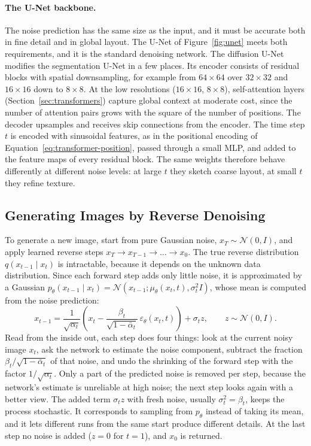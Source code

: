 \paragraph{The U-Net backbone.}
The noise prediction has the same size as the input, and it must be accurate
both in fine detail and in global layout. The U-Net of
Figure~\ref{fig:unet} meets both requirements, and it is the standard
denoising network. The diffusion U-Net modifies the segmentation U-Net in a
few places. Its encoder consists of residual blocks with spatial
downsampling, for example from $64\times64$ over $32\times32$ and
$16\times16$ down to $8\times8$. At the low resolutions ($16\times16$,
$8\times8$), self-attention layers (Section~\ref{sec:transformers}) capture
global context at moderate cost, since the number of attention pairs grows
with the square of the number of positions. The decoder upsamples and
receives skip connections from the encoder. The time step $t$ is encoded with
sinusoidal features, as in the positional encoding of
Equation~\ref{eq:transformer-position}, passed through a small MLP, and added
to the feature maps of every residual block. The same weights therefore
behave differently at different noise levels: at large $t$ they sketch
coarse layout, at small $t$ they refine texture.

\subsection{Generating Images by Reverse Denoising}

To generate a new image, start from pure Gaussian noise, $x_T\sim\mathcal
N(0,I)$, and apply learned reverse steps
$x_T\to x_{T-1}\to\dots\to x_0$. The true reverse distribution
$q(x_{t-1}\mid x_t)$ is intractable, because it depends on the unknown data
distribution. Since each forward step adds only little noise, it is
approximated by a Gaussian $p_\theta(x_{t-1}\mid x_t)=\mathcal
N(x_{t-1};\mu_\theta(x_t,t),\sigma_t^2I)$, whose mean is computed from the
noise prediction:
\begin{equation}
  x_{t-1} = \frac{1}{\sqrt{\alpha_t}}\left(x_t
  - \frac{\beta_t}{\sqrt{1-\bar\alpha_t}}\,\varepsilon_\theta(x_t,t)\right)
  + \sigma_t z,
  \qquad z\sim\mathcal N(0,I).
  \label{eq:diff-reverse}
\end{equation}
\noindent
Read from the inside out, each step does four things: look at the current
noisy image $x_t$, ask the network to estimate the noise component, subtract
the fraction $\beta_t/\sqrt{1-\bar\alpha_t}$ of that noise, and undo the
shrinking of the forward step with the factor $1/\sqrt{\alpha_t}$. Only a
part of the predicted noise is removed per step, because the network's
estimate is unreliable at high noise; the next step looks again with a better
view. The added term $\sigma_t z$ with fresh noise, usually
$\sigma_t^2=\beta_t$, keeps the process stochastic. It corresponds to
sampling from $p_\theta$ instead of taking its mean, and it lets different
runs from the same start produce different details. At the last step no noise
is added ($z=0$ for $t=1$), and $x_0$ is returned.

